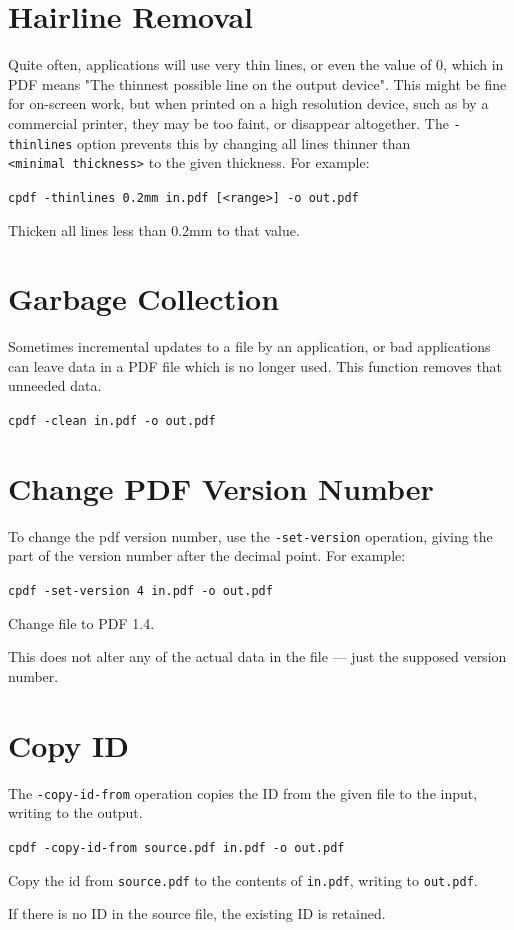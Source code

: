 \documentclass[a4paper,makeidx]{memoir}
\begin{document}
  \section{Hairline Removal}
  Quite often, applications will use very thin lines, or even the value of 0,
which in PDF means "The thinnest possible line on the output device". This
might be fine for on-screen work, but when printed on a high resolution device,
such as by a commercial printer, they may be too faint, or disappear
altogether. The \texttt{-thinlines} option prevents this by changing all lines
thinner than \texttt{<minimal~thickness>} to the given thickness. For example:
  \begin{framed}
  \small\noindent\verb!cpdf -thinlines 0.2mm in.pdf [<range>] -o out.pdf!

  \vspace{2.5mm}
  \noindent Thicken all lines less than 0.2mm to that value.
  \end{framed} 

  \section{Garbage Collection}
  Sometimes incremental updates to a file by an application, or bad
applications can leave data in a PDF file which is no longer used. This
function removes that unneeded data.

  \begin{framed}
  \small\noindent\verb!cpdf -clean in.pdf -o out.pdf!
  \end{framed}
 
  \section{Change PDF Version Number}
   \label{setversion}
   To change the pdf version number, use the \texttt{-set-version} operation,
giving the part of the version number after the decimal point. For example:
  \begin{framed}
  \small\noindent\verb!cpdf -set-version 4 in.pdf -o out.pdf!

  \vspace{2.5mm}
  \noindent Change file to PDF 1.4.
  \end{framed} 
  \noindent This does not alter any of the actual data in the file ---
just the supposed version number.

  \section{Copy ID}
  The \texttt{-copy-id-from} operation copies the ID from the given file to the
input, writing to the output.
  \begin{framed}
  \small\noindent\verb!cpdf -copy-id-from source.pdf in.pdf -o out.pdf!

  \vspace{2.5mm}
  \noindent Copy the id from \texttt{source.pdf} to the contents of \texttt{in.pdf}, writing to \texttt{out.pdf}.
  \end{framed}
  \noindent If there is no ID in the source file, the existing ID is retained.
\end{document}
